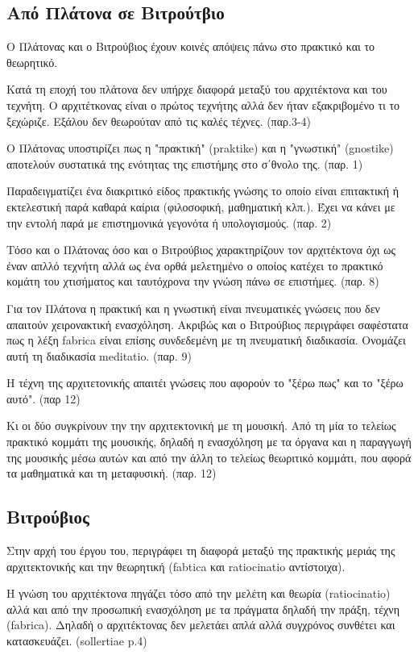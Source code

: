 \subsection{Από Πλάτονα σε Βιτρούτβιο}
 
 Ο Πλάτονας και ο Βιτρούβιος έχουν κοινές απόψεις πάνω στο πρακτικό και το θεωρητικό.
 
 Κατά τη εποχή του πλάτονα δεν υπήρχε διαφορά μεταξύ του αρχιτέκτονα και του τεχνήτη. Ο αρχιτέτκονας είναι ο πρώτος τεχνήτης αλλά δεν ήταν εξακριβομένο τι το ξεχώριζε. Εξάλου δεν θεωρούταν από τις καλές τέχνες. (παρ.3-4)
 
 Ο Πλάτονας υποστιρίζει πως η "πρακτική" (praktike) και η "γνωστική" (gnostike) αποτελούν συστατικά της ενότητας της επιστήμης στο σ΄θνολο της. (παρ. 1)
 
 Παραδειγματίζει ένα διακριτικό είδος πρακτικής γνώσης το οποίο είναι επιτακτική ή εκτελεστική παρά καθαρά καίρια (φιλοσοφική, μαθηματική κλπ.). Έχει να κάνει με την εντολή παρά με επιστημονικά γεγονότα ή υπολογισμούς. (παρ. 2)
 
 Τόσο και ο Πλάτονας όσο και ο Βιτρούβιος χαρακτηρίζουν τον αρχιτέκτονα όχι ως έναν απλλό τεχνήτη αλλά ως ένα ορθά μελετημένο ο οποίος κατέχει το πρακτικό κομάτη του χτισήματος και ταυτόχρονα την γνώση πάνω σε επιστήμες. (παρ. 8)
 
 Για τον Πλάτονα η πρακτική και η γνωστική είναι πνευματικές γνώσεις που δεν απαιτούν χειρονακτική ενασχόληση. Ακριβώς και ο Βιτρούβιος περιγράφει σαφέστατα πως η λέξη fabrica είναι επίσης συνδεδεμένη με τη πνευματική διαδικασία. Ονομάζει αυτή τη διαδικασία meditatio. (παρ. 9)
 
 Η τέχνη της αρχιτετονικής απαιτέι γνώσεις που αφορούν το "ξέρω πως" και το "ξέρω αυτό". (παρ 12)
 
 Κι οι δύο συγκρίνουν την την αρχιτεκτονική με τη μουσική. Από τη μία το τελείως πρακτικό κομμάτι της μουσικής, δηλαδή η ενασχόληση με τα όργανα και η παραγγωγή της μουσικής μέσω αυτών και από την άλλη το τελείως θεωριτικό κομμάτι, που αφορά τα μαθηματικά και τη μεταφυσική. (παρ. 12)
 
\subsection{Βιτρούβιος}
 
 Στην αρχή του έργου του, περιγράφει τη διαφορά μεταξύ της πρακτικής μεριάς της αρχιτεκτονικής και την θεωρητική (fabtica και ratiocinatio αντίστοιχα).
 
 Η γνώση του αρχιτέκτονα πηγάζει τόσο από την μελέτη και θεωρία (ratiocinatio) αλλά και από την προσωπική ενασχόληση με τα πράγματα δηλαδή την πράξη, τέχνη (fabrica). Δηλαδή ο αρχιτέκτονας δεν μελετάει απλά αλλά συγχρόνος συνθέτει και κατασκευάζει. (sollertiae p.4)
 
